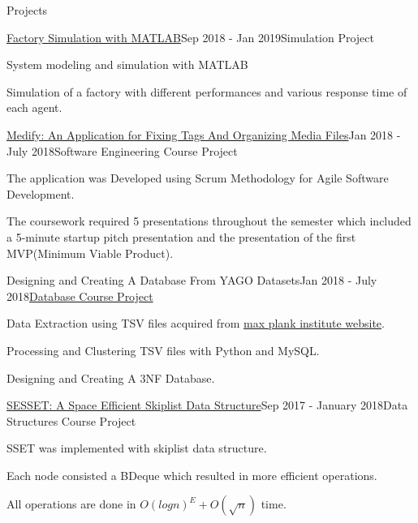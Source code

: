 \documentclass{resume} %
\begin{document}
	\begin{rSection}{Projects}

		\begin{rSubsection}{\href{https://github.com/pouyaaghahoseini/System-Queueing-Simulation}{Factory Simulation with MATLAB}}{Sep 2018 - Jan 2019}{Simulation  Project}{ }
			\item System modeling and simulation with MATLAB
			\item Simulation of a factory with different performances and various response time of each agent.
			
			
		\end{rSubsection}
	
		\begin{rSubsection}{\href{https://github.com/pouyaaghahoseini/Medify}{Medify: An Application for Fixing Tags And Organizing Media Files}}{Jan 2018 - July 2018}{Software Engineering Course Project}{ }
			
			\item The application was Developed using Scrum Methodology for Agile Software Development.
			\item The coursework required 5 presentations throughout the semester which included a 5-minute startup pitch presentation and the presentation of the first MVP(Minimum Viable Product).
		\end{rSubsection}
		
		\begin{rSubsection}{Designing and Creating A Database From YAGO Datasets}{Jan 2018 - July 2018}{\href{https://github.com/pouyaaghahoseini/Database-Course}{Database Course Project}}{ }
			\item Data Extraction using TSV files acquired from \href{https://www.mpi-inf.mpg.de/departments/databases-and-information-systems/research/yago-naga/yago/downloads/}{max plank institute website}.
			\item Processing and Clustering TSV files with Python and MySQL.
			\item Designing and Creating A 3NF Database.
			
		\end{rSubsection}	
		
		
		\begin{rSubsection}{\href{https://github.com/pouyaaghahoseini/DS-Course/tree/master/SE-Skiplist}{SESSET: A Space Efficient Skiplist Data Structure}}{Sep 2017 - January 2018}{Data Structures Course Project}{ }
			\item SSET‌ was implemented with skiplist data structure.
			\item Each node consisted a BDeque which resulted in more efficient operations.
			\item All operations are done in $O(logn)^{E} + O(\sqrt{n})$ time.
		\end{rSubsection}
		

\end{rSection}
\end{document}

